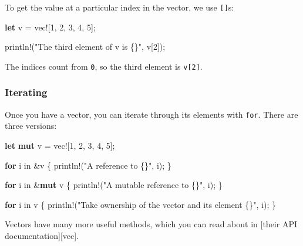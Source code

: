 \documentclass[a4paper,]{book}
\newenvironment{Shaded}{\begin{snugshade}}{\end{snugshade}}
\newcommand{\KeywordTok}[1]{\textcolor[rgb]{0.13,0.29,0.53}{\textbf{{#1}}}}
\newcommand{\DecValTok}[1]{\textcolor[rgb]{0.00,0.00,0.81}{{#1}}}
\newcommand{\StringTok}[1]{\textcolor[rgb]{0.31,0.60,0.02}{{#1}}}
\newcommand{\OtherTok}[1]{\textcolor[rgb]{0.56,0.35,0.01}{{#1}}}
\newcommand{\NormalTok}[1]{{#1}}
\begin{document}
To get the value at a particular index in the vector, we use
\texttt{{[}{]}}s:

\begin{Shaded}
\begin{Highlighting}[]
\KeywordTok{let} \NormalTok{v = }\OtherTok{vec!}\NormalTok{[}\DecValTok{1}\NormalTok{, }\DecValTok{2}\NormalTok{, }\DecValTok{3}\NormalTok{, }\DecValTok{4}\NormalTok{, }\DecValTok{5}\NormalTok{];}

\OtherTok{println!}\NormalTok{(}\StringTok{"The third element of v is \{\}"}\NormalTok{, v[}\DecValTok{2}\NormalTok{]);}
\end{Highlighting}
\end{Shaded}

The indices count from \texttt{0}, so the third element is
\texttt{v{[}2{]}}.

\subsubsection{Iterating}\label{iterating}

Once you have a vector, you can iterate through its elements with
\texttt{for}. There are three versions:

\begin{Shaded}
\begin{Highlighting}[]
\KeywordTok{let} \KeywordTok{mut} \NormalTok{v = }\OtherTok{vec!}\NormalTok{[}\DecValTok{1}\NormalTok{, }\DecValTok{2}\NormalTok{, }\DecValTok{3}\NormalTok{, }\DecValTok{4}\NormalTok{, }\DecValTok{5}\NormalTok{];}

\KeywordTok{for} \NormalTok{i in &v \{}
    \OtherTok{println!}\NormalTok{(}\StringTok{"A reference to \{\}"}\NormalTok{, i);}
\NormalTok{\}}

\KeywordTok{for} \NormalTok{i in &}\KeywordTok{mut} \NormalTok{v \{}
    \OtherTok{println!}\NormalTok{(}\StringTok{"A mutable reference to \{\}"}\NormalTok{, i);}
\NormalTok{\}}

\KeywordTok{for} \NormalTok{i in v \{}
    \OtherTok{println!}\NormalTok{(}\StringTok{"Take ownership of the vector and its element \{\}"}\NormalTok{, i);}
\NormalTok{\}}
\end{Highlighting}
\end{Shaded}

Vectors have many more useful methods, which you can read about in
{[}their API documentation{]}{[}vec{]}.

\end{document}
